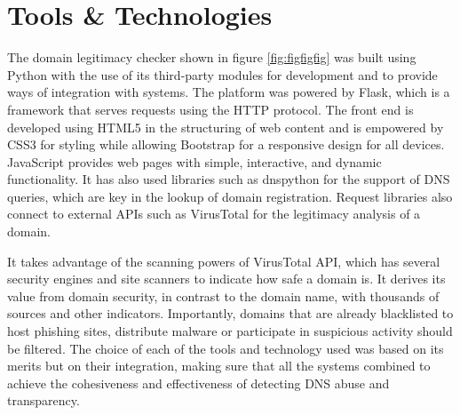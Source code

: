 \section{Tools \& Technologies}

The domain legitimacy checker shown in figure \ref{fig:figfigfig} was built using Python with the use of its third-party modules for development and to provide ways of integration with systems. The platform was powered by Flask, which is a framework that serves requests using the HTTP protocol. The front end is developed using HTML5 in the structuring of web content and is empowered by CSS3 for styling while allowing Bootstrap for a responsive design for all devices. JavaScript provides web pages with simple, interactive, and dynamic functionality. It has also used libraries such as dnspython for the support of DNS queries, which are key in the lookup of domain registration. Request libraries also connect to external APIs such as VirusTotal for the legitimacy analysis of a domain.


It takes advantage of the scanning powers of VirusTotal API, which has several security engines and site scanners to indicate how safe a domain is. It derives its value from domain security, in contrast to the domain name, with thousands of sources and other indicators. Importantly, domains that are already blacklisted to host phishing sites, distribute malware or participate in suspicious activity should be filtered. The choice of each of the tools and technology used was based on its merits but on their integration, making sure that all the systems combined to achieve the cohesiveness and effectiveness of detecting DNS abuse and transparency.



